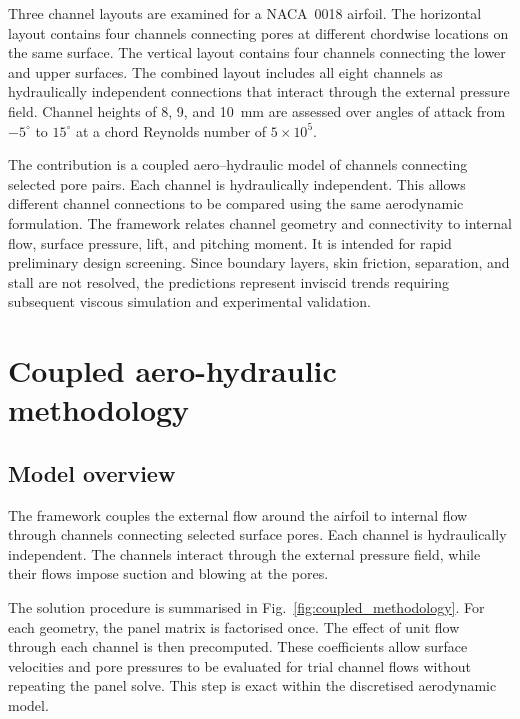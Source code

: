\documentclass[a4paper,fleqn]{cas-dc}
\begin{document}
Three channel layouts are examined for a NACA~0018 airfoil. 
The horizontal layout contains four channels connecting pores at different chordwise locations on the same surface. 
The vertical layout contains four channels connecting the lower and upper surfaces. 
The combined layout includes all eight channels as hydraulically independent connections that interact through the external pressure field. 
Channel heights of 8, 9, and 10~mm are assessed over angles of attack from $-5^{\circ}$ to $15^{\circ}$ at a chord Reynolds number of $5\times10^{5}$.

The contribution is a coupled aero--hydraulic model of channels connecting selected pore pairs. Each channel is hydraulically independent.
This allows different channel connections to be compared using the same aerodynamic formulation.
The framework relates channel geometry and connectivity to internal flow, surface pressure, lift, and pitching moment. 
It is intended for rapid preliminary design screening. Since boundary layers, skin friction, separation, and stall are not resolved, the predictions represent inviscid trends requiring subsequent viscous simulation and experimental validation.



	
	
\section{Coupled aero-hydraulic methodology}
\label{sec:methodology}

\subsection{Model overview}
\label{subsec:model_overview}

The framework couples the external flow around the airfoil to internal flow through channels connecting selected surface pores. 
Each channel is hydraulically independent.
The channels interact through the external pressure field, while their flows impose suction and blowing at the pores.

The solution procedure is summarised in Fig.~\ref{fig:coupled_methodology}.
For each geometry, the panel matrix is factorised once.
The effect of unit flow through each channel is then precomputed. 
These coefficients allow surface velocities and pore pressures to be evaluated for trial channel flows without repeating the panel solve.
This step is exact within the discretised aerodynamic model.
\end{document}
